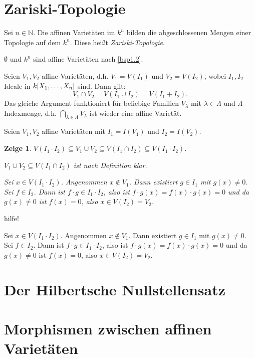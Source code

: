 \documentclass[a4paper,12pt]{scrbook}
\makeatletter
\theoremstyle{blah}
\newtheorem*{zeige}{Zeige}
\theoremstyle{stz}
\renewcommand{\proofname}{Beweis}
\renewenvironment{proof}[1][\proofname]{\par
  \pushQED{\qed}%
  \normalfont \topsep6\p@\@plus6\p@\relax
  \trivlist
  \item[\hskip\labelsep
        \itshape
    #1\@addpunct{:}]\ignorespaces
}{%
  \popQED\endtrivlist\@endpefalse
}
\newcommand{\leer}{\ensuremath{\emptyset}}
\newcommand{\set}[1]{\ensuremath{\mathbb{#1}}}
\newcommand{\N}{\set{N}}
\newcommand{\polyx}{\ensuremath%
  [X_{1},\dotsc,X_{n}]}
\makeatother
\begin{document}
\section{Zariski-Topologie}

\begin{db}Sei $n\in\N$. Die affinen Varietäten im $k^{n}$ bilden die abgeschlossenen Mengen einer Topologie auf dem $k^{n}$. Diese heißt \emph{Zariski-Topologie}.\end{db}
\begin{proof}\begin{prooflist}
\item $\leer$ und $k^{n}$ sind affine Varietäten nach \autoref{bsp1.2}.
\item Seien $V_{1},V_{2}$ affine Varietäten, d.h. $V_{1}=V(I_{1})$ und $V_{2}=V(I_{2})$, wobei $I_{1},I_{2}$ Ideale in $k\polyx$ sind. Dann gilt:
\[V_{1}\cap V_{2}=V(I_{1}\cup I_{2}) = V(I_{1}+I_{2}).\]
Das gleiche Argument funktioniert für beliebige Familien $V_{\lambda}$ mit $\lambda\in\Lambda$ und $\Lambda$ Indexmenge, d.h. $\displaystyle\bigcap_{\lambda\in\Lambda}V_{\lambda}$ ist wieder eine affine Varietät.
\item Seien $V_{1},V_{2}$ affine Varietäten mit $I_{1}=I(V_{1})$ und $I_{2}=I(V_{2})$.
\begin{zeige} $V(I_{1}\cdot I_{2})\subseteq V_{1}\cup V_{2}\subseteq V(I_{1}\cap I_{2})\subseteq V(I_{1}\cdot I_{2})$.
\begin{prooflist}
\item $V_{1}\cup V_{2}\subseteq V(I_{1}\cap I_{2})$ ist nach Definition klar.
\item Sei $x\in V(I_{1}\cdot I_{2})$. Angenommen $x\notin V_{1}$. Dann existiert $g\in I_{1}$ mit $g(x)\neq 0$. Sei $f\in I_{2}$. Dann ist $f\cdot g\in I_{1}\cdot I_{2}$, also ist $f\cdot g(x) = f(x)\cdot g(x) = 0$ und da $g(x)\neq 0$ ist $f(x)=0$, also $x\in V(I_{2})=V_{2}$.
\end{prooflist}\end{zeige}
\end{prooflist}\end{proof}

\begin{w}hilfe!\end{w}

\begin{w}Sei $x\in V(I_{1}\cdot I_{2})$. Angenommen $x\notin V_{1}$. Dann existiert $g\in I_{1}$ mit $g(x)\neq 0$. Sei $f\in I_{2}$. Dann ist $f\cdot g\in I_{1}\cdot I_{2}$, also ist $f\cdot g(x) = f(x)\cdot g(x) = 0$ und da $g(x)\neq 0$ ist $f(x)=0$, also $x\in V(I_{2})=V_{2}$.\end{w}

\section{Der Hilbertsche Nullstellensatz}

\section{Morphismen zwischen affinen Varietäten}
\end{document}

